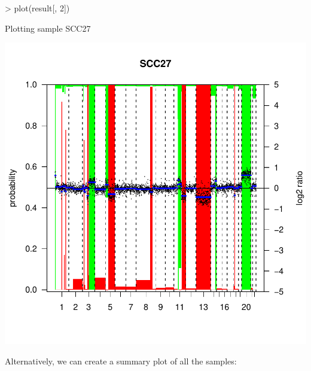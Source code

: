 \documentclass[11pt]{article}
\begin{document}
\pagebreak
\begin{center}
\begin{Schunk}
\begin{Sinput}
> plot(result[, 2])
\end{Sinput}
\begin{Soutput}
Plotting sample SCC27 
\end{Soutput}
\end{Schunk}
\includegraphics{CGHcall-007}
\end{center}

\pagebreak
\noindent
Alternatively, we can create a summary plot of all the samples:
\end{document}
